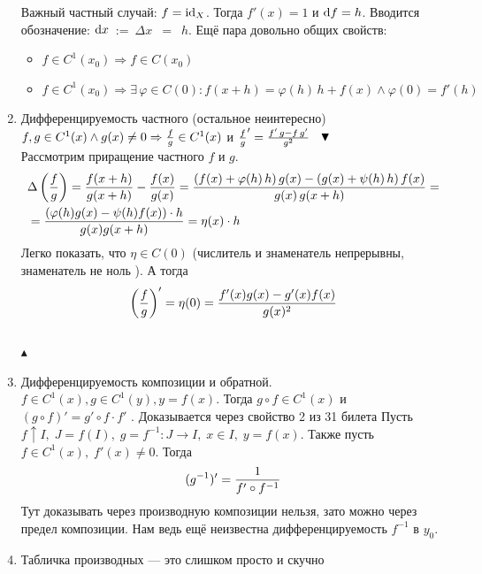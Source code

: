 \documentclass[a4paper,12pt]{article}
\theoremstyle{plain}
\theoremstyle{definition}
\theoremstyle{remark}
\newenvironment{itlproof}{$\phantom{0}\\ \blacktriangledown$ \\ }%
{ \phantom{0}\\ $\blacktriangle$ \\}
\def\resetdefs{ \setcounter{defn}{0}\setcounter{exmp}{0} }
\def\resetthrm{ \setcounter{thrm}{0}\setcounter{stat}{0} }
\def\resetrem{ \setcounter{rem}{0} }
\def\resetall{ \resetdefs \resetthrm \resetrem}
\begin{document}
\begin{enumerate}
    Важный частный случай: $f = {\rm id}_X$. Тогда $f'(x) = 1$ и ${\rm d}f = h$.
    Вводится обозначение: ${\rm d}x$~:=~$\Delta x$~$=$~$h$.
    Ещё пара довольно общих свойств:
    \begin{itemize}
      \item $f \in C^1(x_0) \Rightarrow  f \in C(x_0)$
      \item $f \in C^1(x_0) \Rightarrow \exists\, \varphi \in C(0) : 
        f(x + h) = \varphi(h)\,h+f(x) \land \varphi(0) = f'(h)$
    \end{itemize}
  \item Дифференцируемость частного (остальное неинтересно)
    { \stat $f, g \in C^1(x) \land g(x)\neq 0\Rightarrow {f \over g} \in C^1(x)$ и 
    ${f \over g}' = {f'\,g - f\,g' \over g^2}$ } 
    \begin{itlproof}
      Рассмотрим приращение частного $f$  и $g$.
      \begin{align*}
        &\Delta\left({f \over g}\right) = {f(x+h) \over g(x+h)} - {f(x) \over g(x)} = 
        { (f(x)+\varphi(h)\,h)\,g(x) - (g(x)+\psi(h)\,h)\,f(x)  \over g(x)\,g(x+h)} = \\
        &= { (\varphi(h)g(x)-\psi(h)f(x))\cdot h \over g(x)g(x+h)} = \eta(x) \cdot h 
      \end{align*}
      Легко показать, что $\eta \in C(0) $ (числитель и знаменатель непрерывны, 
      знаменатель не ноль ).
      А тогда $$
      \left( {f \over g} \right)' = \eta(0) = { f'(x)g(x)-g'(x)f(x) \over g(x)^2} $$ 
    \end{itlproof}
  \item Дифференцируемость композиции и обратной.
    \resetall
    { \stat $f \in C^1(x), g \in C^1(y), y=f(x) $. Тогда $g\circ f \in C^1(x)$ 
    и $(g\circ f)' = g'\circ f \cdot f'$ }. Доказывается через свойство 2 из 31 билета
    { \stat Пусть $f \uparrow I,\; J=f(I),\; g=f^{-1}: J \to I,\; x \in I,\; y=f(x)$.
    Также пусть $f \in C^1(x),\; f'(x) \neq 0$. Тогда $$(g^{-1})'={1\over f'\circ f^{-1}}$$ }
    Тут доказывать через производную композиции нельзя, зато можно через предел композиции. 
    Нам ведь ещё неизвестна дифференцируемость $f^{-1}$ в $y_0$.  
  \item Табличка производных --- это слишком просто и скучно 
   

\end{enumerate}
\end{document}
